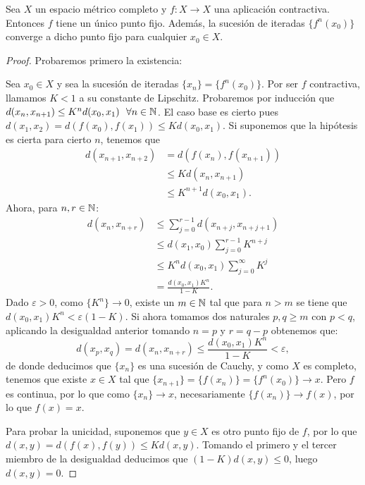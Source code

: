 \begin{teorema}
    \label{th:punto-fijo}
    Sea $X$ un espacio métrico completo y $f:X\longrightarrow X$ una aplicación contractiva. Entonces $f$ tiene un único punto fijo. Además, la sucesión de iteradas $\{f^n(x_0)\}$ converge a dicho punto fijo para cualquier $x_0\in X$. 
\end{teorema}
\begin{proof}
    Probaremos primero la existencia:

    Sea $x_0\in X$ y sea la sucesión de iteradas $\{x_n\}=\{f^n(x_0)\}$. Por ser $f$ contractiva, llamamos $K<1$ a su constante de Lipschitz. Probaremos por inducción que $d(x_n,x_{n+1})\leq K^n d(x_0,x_1) \ \ \forall n\in\mathbb{N}$.
    El caso base es cierto pues $d(x_1,x_2)=d(f(x_0),f(x_1))\leq K d(x_0,x_1)$. Si suponemos que la hipótesis es cierta para cierto $n$, tenemos que
    \begin{equation*}
      \begin{split}
        d(x_{n+1},x_{n+2})&=d(f(x_n),f(x_{n+1})) \\
        &\leq K d(x_n,x_{n+1}) \\
        &\leq K^{n+1}d(x_0,x_1).
      \end{split}
    \end{equation*}
    Ahora, para $n,r\in\mathbb{N}$:
    \begin{equation*}
      \begin{split}
        d(x_n,x_{n+r}) & \leq \sum_{j=0}^{r-1}d(x_{n+j},x_{n+j+1}) \\
        &\leq d(x_1,x_0)\sum_{j=0}^{r-1}K^{n+j} \\
        &\leq K^n d(x_0,x_1)\sum_{j=0}^{\infty} K^j \\
        &= \frac{d(x_0,x_1)K^n}{1-K}.
      \end{split}
    \end{equation*}
    Dado $\varepsilon>0$, como $\{K^n\}\rightarrow 0$, existe un $m\in\mathbb{N}$ tal que para $n>m$ se tiene que $d(x_0,x_1)K^n<\varepsilon(1-K)$. Si ahora tomamos dos naturales $p,q\geq m$ con $p<q$, aplicando la desigualdad anterior tomando $n=p$ y $r=q-p$ obtenemos que:
    $$
    d(x_p,x_q) = d(x_n, x_{n+r}) \leq \frac{d(x_0,x_1)K^n}{1-K} < \varepsilon,
    $$
    de donde deducimos que $\{x_n\}$ es una sucesión de Cauchy, y como $X$ es completo, tenemos que existe $x\in X$ tal que $\{x_{n+1}\}=\{f(x_n)\}=\{f^n(x_0)\}\rightarrow x$. Pero $f$ es continua, por lo que como $\{x_n\}\rightarrow x$, necesariamente $\{f(x_n)\}\rightarrow f(x)$, por lo que $f(x)=x$.

    Para probar la unicidad, suponemos que $y\in X$ es otro punto fijo de $f$, por lo que $d(x,y) = d(f(x),f(y))\leq K d(x,y)$. Tomando el primero y el tercer miembro de la desigualdad deducimos que $(1-K)d(x,y)\leq 0$, luego $d(x,y)=0$.
\end{proof}

